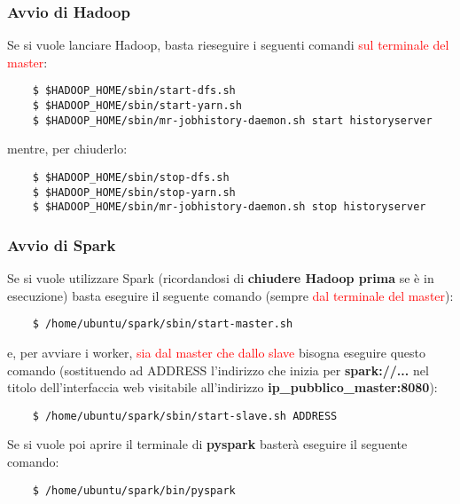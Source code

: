 \subsubsection{Avvio di Hadoop}

Se si vuole lanciare Hadoop, basta rieseguire i seguenti comandi \textcolor{red}{sul terminale del master}:

\begin{verbatim}
    $ $HADOOP_HOME/sbin/start-dfs.sh
    $ $HADOOP_HOME/sbin/start-yarn.sh
    $ $HADOOP_HOME/sbin/mr-jobhistory-daemon.sh start historyserver
\end{verbatim}

mentre, per chiuderlo:

\begin{verbatim}
    $ $HADOOP_HOME/sbin/stop-dfs.sh
    $ $HADOOP_HOME/sbin/stop-yarn.sh
    $ $HADOOP_HOME/sbin/mr-jobhistory-daemon.sh stop historyserver
\end{verbatim}


\subsubsection{Avvio di Spark}

Se si vuole utilizzare Spark (ricordandosi di \textbf{chiudere Hadoop prima} se è in esecuzione) basta eseguire il seguente comando (sempre \textcolor{red}{dal terminale del master}):

\begin{verbatim}
    $ /home/ubuntu/spark/sbin/start-master.sh
\end{verbatim}

e, per avviare i worker, \textcolor{red}{sia dal master che dallo slave} bisogna eseguire questo comando (sostituendo ad ADDRESS l'indirizzo che inizia per \textbf{spark://...} nel titolo dell'interfaccia web visitabile all'indirizzo \textbf{ip\_pubblico\_master:8080}):

\begin{verbatim}
    $ /home/ubuntu/spark/sbin/start-slave.sh ADDRESS
\end{verbatim}

Se si vuole poi aprire il terminale di \textbf{pyspark} basterà eseguire il seguente comando:

\begin{verbatim}
    $ /home/ubuntu/spark/bin/pyspark
\end{verbatim}
